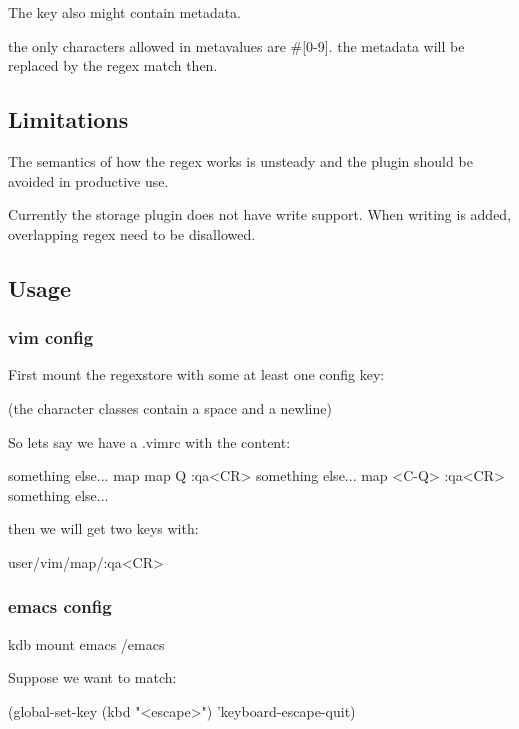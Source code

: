 The key also might contain metadata.


\begin{DoxyItemize}
\item the only characters allowed in metavalues are \textquotesingle{}\#\mbox{[}0-\/9\mbox{]}\textquotesingle{}. the metadata will be replaced by the regex match then.
\end{DoxyItemize}

\subsection*{Limitations}

The semantics of how the regex works is unsteady and the plugin should be avoided in productive use.

Currently the storage plugin does not have write support. When writing is added, overlapping regex need to be disallowed.

\subsection*{Usage}

\subsubsection*{vim config}

First mount the regexstore with some at least one config key\+:




(the character classes contain a space and a newline)

So lets say we have a .vimrc with the content\+:


\begin{DoxyCode}
something else...
map map Q :qa<CR>
something else...
map <C-Q> :qa<CR>
something else...
\end{DoxyCode}


then we will get two keys with\+:


\begin{DoxyCode}
user/vim/map/:qa<CR>
\end{DoxyCode}


\subsubsection*{emacs config}


\begin{DoxyCode}
kdb mount emacs /emacs
\end{DoxyCode}


Suppose we want to match\+:


\begin{DoxyCode}
(global-set-key (kbd "<escape>")      'keyboard-escape-quit)
\end{DoxyCode}
 